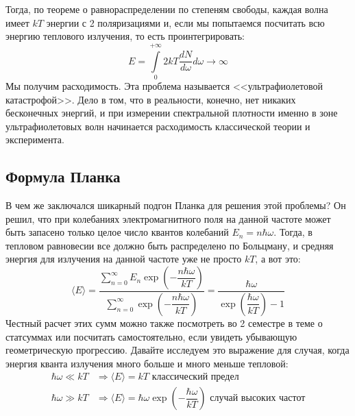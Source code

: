 \documentclass[12pt]{article}
\begin{document}
\vspace{-8mm}
\noindent Тогда, по теореме о равнораспределении по степеням свободы, каждая волна имеет $kT$ энергии с 2 поляризациями и, если мы попытаемся посчитать всю энергию теплового излучения, то есть проинтегрировать: 
\begin{equation*}
    E = \int\limits_{0}^{+\infty} 2kT\dfrac{dN}{d\omega}d\omega \rightarrow \infty
\end{equation*}
Мы получим расходимость. Эта проблема называется <<ультрафиолетовой катастрофой>>. Дело в том, что в реальности, конечно, нет никаких бесконечных энергий, и при измерении спектральной плотности именно в зоне ультрафиолетовых волн начинается расходимость классической теории и эксперимента.

\subsection{Формула Планка}
В чем же заключался шикарный подгон Планка для решения этой проблемы? Он решил, что при колебаниях электромагнитного поля на данной частоте может быть запасено только целое число квантов колебаний $E_n =n \hbar \omega$. Тогда, в тепловом равновесии все должно быть распределено по Больцману, и средняя энергия для излучения на данной частоте уже не просто $kT$, а вот это:
\begin{equation*}
    \langle E \rangle = \dfrac{\sum\limits_{n=0}^{\infty} E_n \exp{\left(-\dfrac{n\hbar \omega}{kT}\right)}}{\sum\limits_{n=0}^{\infty} \exp{\left(-\dfrac{n\hbar \omega}{kT}\right)}} = \dfrac{\hbar \omega}{\exp{\left(\dfrac{\hbar \omega}{kT}\right)} - 1}
\end{equation*}
Честный расчет этих сумм можно также посмотреть во 2 семестре в теме о статсуммах или посчитать самостоятельно, если увидеть убывающую геометрическую прогрессию. Давайте исследуем это выражение для случая, когда энергия кванта излучения много больше и много меньше тепловой:\vspace{-1mm}
\begin{align*}
    \hbar \omega \ll kT &\Rightarrow \langle E \rangle = kT \text{ классический предел} \\
    \hbar \omega \gg kT &\Rightarrow \langle E \rangle = \hbar \omega  \exp{\left(-\dfrac{\hbar \omega}{kT}\right)} \text{ случай высоких частот}
\end{align*}
\end{document}
